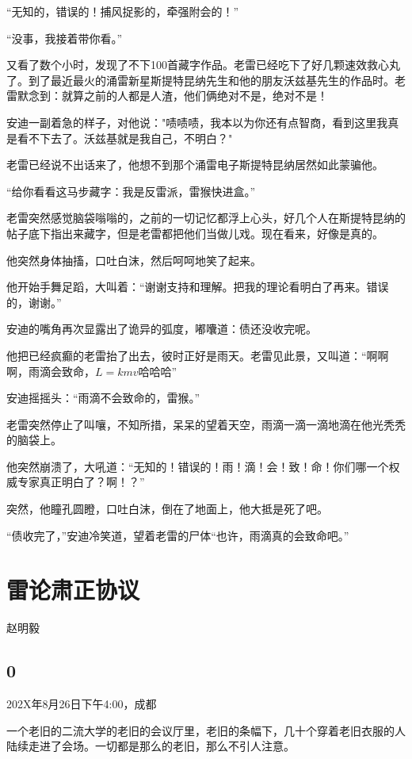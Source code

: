 \documentclass[UTF8,12pt,oneside]{ctexbook}
\begin{document}
“无知的，错误的！捕风捉影的，牵强附会的！”

“没事，我接着带你看。”

又看了数个小时，发现了不下100首藏字作品。老雷已经吃下了好几颗速效救心丸了。到了最近最火的涌雷新星斯提特昆纳先生和他的朋友沃兹基先生的作品时。老雷默念到：就算之前的人都是人渣，他们俩绝对不是，绝对不是！

安迪一副着急的样子，对他说："啧啧啧，我本以为你还有点智商，看到这里我真是看不下去了。沃兹基就是我自己，不明白？"

老雷已经说不出话来了，他想不到那个涌雷电子斯提特昆纳居然如此蒙骗他。

“给你看看这马步藏字：我是反雷派，雷猴快进盒。”

老雷突然感觉脑袋嗡嗡的，之前的一切记忆都浮上心头，好几个人在斯提特昆纳的帖子底下指出来藏字，但是老雷都把他们当做儿戏。现在看来，好像是真的。

他突然身体抽搐，口吐白沫，然后呵呵地笑了起来。

他开始手舞足蹈，大叫着：“谢谢支持和理解。把我的理论看明白了再来。错误的，谢谢。”

安迪的嘴角再次显露出了诡异的弧度，嘟囔道：债还没收完呢。

他把已经疯癫的老雷抬了出去，彼时正好是雨天。老雷见此景，又叫道：“啊啊啊，雨滴会致命，$L=kmv$哈哈哈”

安迪摇摇头：“雨滴不会致命的，雷猴。”

老雷突然停止了叫嚷，不知所措，呆呆的望着天空，雨滴一滴一滴地滴在他光秃秃的脑袋上。

他突然崩溃了，大吼道：“无知的！错误的！雨！滴！会！致！命！你们哪一个权威专家真正明白了？啊！？”

突然，他瞳孔圆瞪，口吐白沫，倒在了地面上，他大抵是死了吧。

“债收完了，”安迪冷笑道，望着老雷的尸体“也许，雨滴真的会致命吧。”

\newpage

\section{雷论肃正协议}
\begin{center}
    赵明毅
\end{center}

\subsection{0}
202X年8月26日下午4:00，成都

一个老旧的二流大学的老旧的会议厅里，老旧的条幅下，几十个穿着老旧衣服的人陆续走进了会场。一切都是那么的老旧，那么不引人注意。
\end{document}
